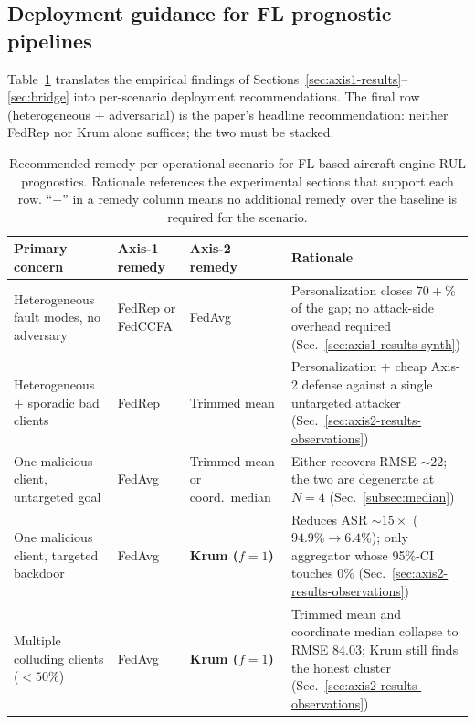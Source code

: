 \documentclass[a4paper,fleqn,doubleblind]{cas-sc}
\newcommand{\tblhead}{\rowcolor{tblHeadBg}}
\newcommand{\zebra}{\rowcolors{2}{tblAltBg}{white}}
\newcommand{\tblhead}{}
\newcommand{\zebra}{}
\begin{document}
\subsection{Deployment guidance for FL prognostic pipelines}
\label{sec:discuss-guidance}

Table~\ref{tab:guidance} translates the empirical findings of
Sections~\ref{sec:axis1-results}--\ref{sec:bridge} into per-scenario
deployment recommendations. The final row (heterogeneous $+$
adversarial) is the paper's headline recommendation: neither FedRep
nor Krum alone suffices; the two must be stacked.

\begin{table}[pos=tbp]
\centering
\footnotesize
\setlength{\tabcolsep}{4pt}
\renewcommand{\arraystretch}{1.25}
\caption{Recommended remedy per operational scenario for FL-based
aircraft-engine RUL prognostics. Rationale references the experimental
sections that support each row. ``$-$'' in a remedy column means no
additional remedy over the baseline is required for the scenario.}
\label{tab:guidance}
\zebra
\begin{tabular}{@{}>{\raggedright\arraybackslash}p{4.1cm} >{\raggedright\arraybackslash}p{2.7cm} >{\raggedright\arraybackslash}p{2.7cm} >{\raggedright\arraybackslash}p{4.3cm}@{}}
\toprule
\tblhead
Primary concern & Axis-1 remedy & Axis-2 remedy & Rationale \\
\midrule
Heterogeneous fault modes, no adversary       & FedRep or FedCCFA          & FedAvg                             & Personalization closes $70+\%$ of the gap; no attack-side overhead required (Sec.~\ref{sec:axis1-results-synth}) \\
Heterogeneous $+$ sporadic bad clients        & FedRep                     & Trimmed mean                       & Personalization $+$ cheap Axis-2 defense against a single untargeted attacker (Sec.~\ref{sec:axis2-results-observations}) \\
One malicious client, untargeted goal         & FedAvg                     & Trimmed mean or coord.\ median     & Either recovers RMSE $\sim 22$; the two are degenerate at $N = 4$ (Sec.~\ref{subsec:median}) \\
One malicious client, targeted backdoor       & FedAvg                     & \textbf{Krum ($f = 1$)}            & Reduces ASR $\sim 15\times$ ($94.9\% \to 6.4\%$); only aggregator whose 95\%-CI touches $0\%$ (Sec.~\ref{sec:axis2-results-observations}) \\
Multiple colluding clients ($< 50\%$)         & FedAvg                     & \textbf{Krum ($f = 1$)}            & Trimmed mean and coordinate median collapse to RMSE $84.03$; Krum still finds the honest cluster (Sec.~\ref{sec:axis2-results-observations}) \\

\end{tabular}
\end{table}
\end{document}
